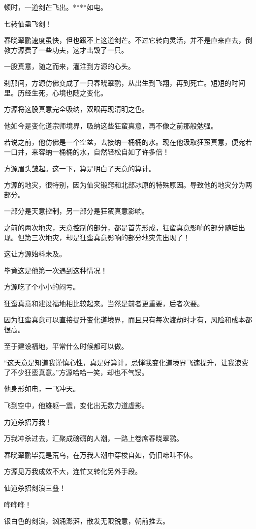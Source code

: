 \begin{this_body}
顿时，一道剑芒飞出。****如电。

七转仙蛊飞剑！

春晓翠鹂速度虽快，但也跟不上这道剑芒。不过它转向灵活，并不是直来直去，倒教方源费了一些功夫，这才击毁了一只。

一股真意，随之而来，灌注到方源的心头。

刹那间，方源仿佛变成了一只春晓翠鹂，从出生到飞翔，再到死亡。短短的时间里。历经生死，心境也随之变化。

方源将这股真意完全吸纳，双眼再现清明之色。

他如今是变化道宗师境界，吸纳这些狂蛮真意，再不像之前那般勉强。

若说之前，他仿佛是一个空盆，去接纳一桶桶的水。现在他汲取狂蛮真意，便宛若一口井，来容纳一桶桶的水，自然轻松自如了许多倍！

方源眉头皱起。这一下，算是明白了天意的算计。

方源的地灾，很特别，因为仙灾锻窍和北部冰原的特殊原因。导致他的地灾分为两部分。

一部分是天意控制，另一部分是狂蛮真意影响。

之前的两次地灾，天意控制的部分，都是首先形成，狂蛮真意影响的部分随后出现。但第三次地灾，却是狂蛮真意影响的部分地灾先出现了！

这让方源始料未及。

毕竟这是他第一次遇到这种情况！

方源吃了个小小的闷亏。

狂蛮真意和建设福地相比较起来。当然是前者更重要，后者次要。

因为狂蛮真意可以直接提升变化道境界，而且只有每次渡劫时才有，风险和成本都很高。

至于建设福地，平常什么时候都可以做。

“这天意是知道我谨慎心性，真是好算计，忌惮我变化道境界飞速提升，让我浪费了不少狂蛮真意。”方源哈哈一笑，却也不气馁。

他身形如电，一飞冲天。

飞到空中，他雄躯一震，变化出无数力道虚影。

力道杀招万我！

万我冲杀过去，汇聚成磅礴的人潮，一路上卷席春晓翠鹂。

春晓翠鹂毕竟是荒鸟，在万我人潮中穿梭自如，仍旧啼叫不休。

方源见万我成效不大，连忙又转化另外手段。

仙道杀招剑浪三叠！

哗哗哗！

银白色的剑浪，汹涌澎湃，散发无限锐意，朝前推去。


\end{this_body}
